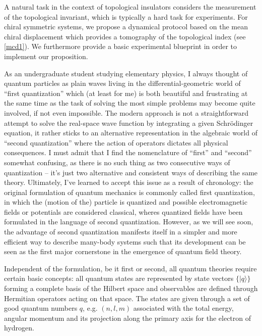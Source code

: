 A natural task in the context of topological insulators considers the measurement of the topological invariant, which is typically a hard task for experiments.
For chiral symmetric systems, we propose a dynamical protocol based on the mean chiral displacement which provides a tomography of the topological index (see \cref{mcd1}).
We furthermore provide a basic experimental blueprint in order to implement our proposition.

As an undergraduate student studying elementary physics, I always thought of quantum particles as plain waves living in the differential-geometric world of ``first quan\-ti\-zation'' which (at least for me) is both beautiful and frustrating at the same time as the task of solving the most simple problems may become quite involved, if not even impossible.
The modern approach is not a straightforward attempt to solve the real-space wave function by integrating a given Schrödinger equation, it rather sticks to an alternative representation in the algebraic world of ``second quantization'' where the action of operators dictates all physical consequences.
I must admit that I find the nomenclature of ``first'' and ``second'' somewhat confusing, as there is no such thing as two consecutive ways of quantization -- it's just two alternative and consistent ways of describing the same theory.
Ultimately, I've learned to accept this issue as a result of chronology: the original formulation of quantum mechanics is commonly called first quantization, in which the (motion of the) particle is quantized and possible electromagnetic fields or potentials are considered classical, wheres quantized fields have been formulated in the language of second quantization.
However, as we will see soon, the advantage of second quantization manifests itself in a simpler and more efficient way to describe many-body systems such that its development can be seen as the first major cornerstone in the emergence of quantum field theory.

Independent of the formulation, be it first or second, all quantum theories require certain basic concepts:
all quantum states are represented by state vectors $\{|q\rangle\}$ forming a complete basis of the Hilbert space and observables are defined through Hermitian operators acting on that space.
The states are given through a set of good quantum numbers $q$, e.g. $(n,l,m)$ associated with the total energy, angular momentum and its projection along the primary axis for the electron of hydrogen.

